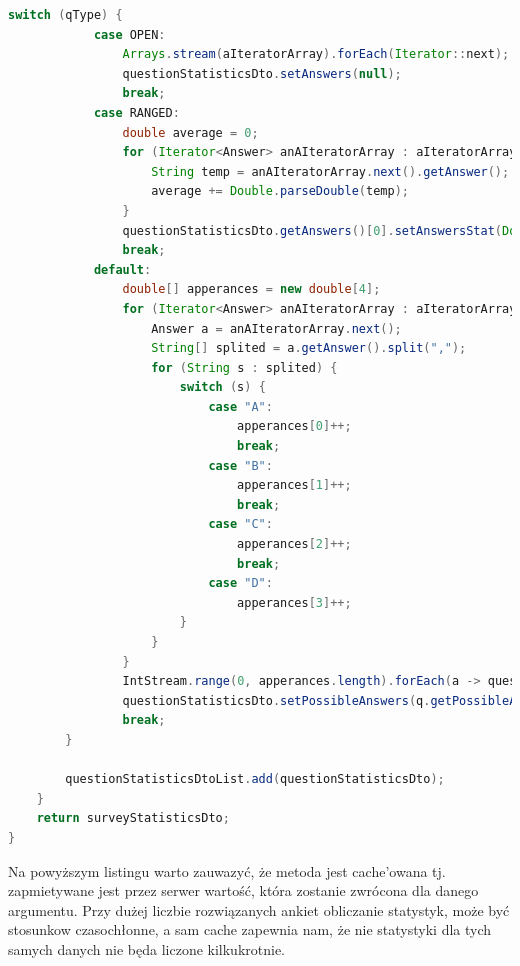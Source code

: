 \documentclass[a4paper]{article}
\begin{document}
\begin{lstlisting}[language=Java,tabsize=2,frame=single,breaklines=true]
		switch (qType) {
			case OPEN:
				Arrays.stream(aIteratorArray).forEach(Iterator::next);
				questionStatisticsDto.setAnswers(null);
				break;
			case RANGED:
				double average = 0;
				for (Iterator<Answer> anAIteratorArray : aIteratorArray) {
					String temp = anAIteratorArray.next().getAnswer();
					average += Double.parseDouble(temp);
				}
				questionStatisticsDto.getAnswers()[0].setAnswersStat(Double.toString(average / answersSize));
				break;
			default:
				double[] apperances = new double[4];
				for (Iterator<Answer> anAIteratorArray : aIteratorArray) {
					Answer a = anAIteratorArray.next();
					String[] splited = a.getAnswer().split(",");
					for (String s : splited) {
						switch (s) {
							case "A":
								apperances[0]++;
								break;
							case "B":
								apperances[1]++;
								break;
							case "C":
								apperances[2]++;
								break;
							case "D":
								apperances[3]++;
		           		}
					}
				}
				IntStream.range(0, apperances.length).forEach(a -> questionStatisticsDto.getAnswers()[a].setAnswersStat(Double.toString(100 * apperances[a] / answersSize)));
				questionStatisticsDto.setPossibleAnswers(q.getPossibleAnswers());
				break;
		}
            
		questionStatisticsDtoList.add(questionStatisticsDto);
	}
	return surveyStatisticsDto;
}
\end{lstlisting}
Na powyższym listingu warto zauwazyć, że metoda jest cache'owana tj. zapmietywane jest przez serwer wartość, która zostanie zwrócona dla danego argumentu. Przy dużej liczbie rozwiązanych ankiet obliczanie statystyk, może być stosunkow czasochłonne, a sam cache zapewnia nam, że nie statystyki dla tych samych danych nie będa liczone kilkukrotnie.
\end{document}
